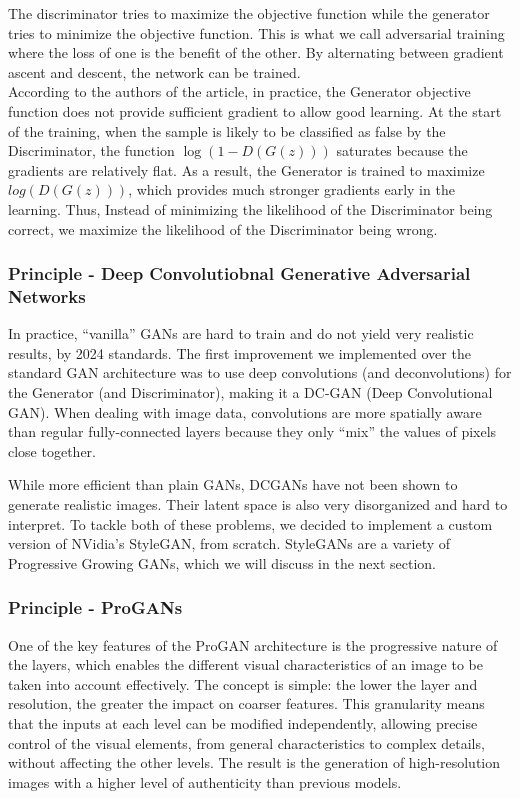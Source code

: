 \documentclass{article}
\begin{document}
The discriminator tries to maximize the objective function while the generator tries to minimize the objective function. This is what we call adversarial training where the loss of one is the benefit of the other. By alternating between gradient ascent and descent, the network can be trained.\\

According to the authors of the article, in practice, the Generator objective function does not provide sufficient gradient to allow good learning. At the start of the training, when the sample is likely to be classified as false by the Discriminator, the function $\log(1 - D(G(z)))$  saturates because the gradients are relatively flat. As a result, the Generator is trained to maximize $log(D(G(z)))$, which provides much stronger gradients early in the learning. Thus, Instead of minimizing the likelihood of the Discriminator being correct, we maximize the likelihood of the Discriminator being wrong. 

\subsubsection*{Principle - Deep Convolutiobnal Generative Adversarial Networks}
In practice, “vanilla” GANs are hard to train and do not yield very realistic results, by 2024 standards. The first improvement we implemented over the standard GAN architecture was to use deep convolutions (and deconvolutions) for the Generator (and Discriminator), making it a DC-GAN (Deep Convolutional GAN). When dealing with image data, convolutions are more spatially aware than regular fully-connected layers because they only “mix” the values of pixels close together.

While more efficient than plain GANs, DCGANs have not been shown to generate realistic images. Their latent space is also very disorganized and hard to interpret. To tackle both of these problems, we decided to implement a custom version of NVidia’s StyleGAN, from scratch. StyleGANs are a variety of Progressive Growing GANs, which we will discuss in the next section.

\subsubsection*{Principle - ProGANs}
One of the key features of the ProGAN architecture is the progressive nature of the layers, which enables the different visual characteristics of an image to be taken into account effectively. 
The concept is simple: the lower the layer and resolution, the greater the impact on coarser features. 
This granularity means that the inputs at each level can be modified independently, allowing precise control of the visual elements, from general characteristics to complex details, without affecting the other levels. 
The result is the generation of high-resolution images with a higher level of authenticity than previous models.
\end{document}
